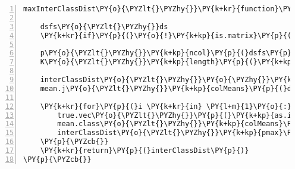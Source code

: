 \begin{Verbatim}[commandchars=\\\{\},codes={\catcode`\$=3\catcode`\^=7\catcode`\_=8},gobble=0,numbers=left,fontfamily=fvm,fontshape=n,fontsize=\footnotesize,tabsize=2]
maxInterClassDist\PY{o}{\PYZlt{}\PYZhy{}}\PY{k+kr}{function}\PY{p}{(}ds\PY{p}{,}class.vec\PY{p}{)}\PY{p}{\PYZob{}}

	dsfs\PY{o}{\PYZlt{}\PYZhy{}}ds
	\PY{k+kr}{if}\PY{p}{(}\PY{o}{!}\PY{k+kp}{is.matrix}\PY{p}{(}dsfs\PY{p}{)}\PY{p}{)} dsfs\PY{o}{\PYZlt{}\PYZhy{}}\PY{k+kp}{data.matrix}\PY{p}{(}dsfs\PY{p}{)}  
	
	p\PY{o}{\PYZlt{}\PYZhy{}}\PY{k+kp}{ncol}\PY{p}{(}dsfs\PY{p}{)}
	K\PY{o}{\PYZlt{}\PYZhy{}}\PY{k+kp}{length}\PY{p}{(}\PY{k+kp}{levels}\PY{p}{(}class.vec\PY{p}{)}\PY{p}{)}
	
	interClassDist\PY{o}{\PYZlt{}\PYZhy{}}\PY{o}{\PYZhy{}}\PY{k+kc}{Inf}
	mean.j\PY{o}{\PYZlt{}\PYZhy{}}\PY{k+kp}{colMeans}\PY{p}{(}dsfs\PY{p}{)}
	
	\PY{k+kr}{for}\PY{p}{(}i \PY{k+kr}{in} \PY{l+m}{1}\PY{o}{:}K\PY{p}{)}\PY{p}{\PYZob{}}
		true.vec\PY{o}{\PYZlt{}\PYZhy{}}\PY{p}{(}\PY{k+kp}{as.integer}\PY{p}{(}class.vec\PY{p}{)}\PY{o}{==}i\PY{p}{)}
		mean.class\PY{o}{\PYZlt{}\PYZhy{}}\PY{k+kp}{colMeans}\PY{p}{(}\PY{k+kp}{as.matrix}\PY{p}{(}dsfs\PY{p}{[}true.vec\PY{p}{,}\PY{p}{]}\PY{p}{,}ncol\PY{o}{=}p\PY{p}{)}\PY{p}{)}
		interClassDist\PY{o}{\PYZlt{}\PYZhy{}}\PY{k+kp}{pmax}\PY{p}{(}interClassDist\PY{p}{,}\PY{k+kp}{abs}\PY{p}{(}mean.j\PY{o}{\PYZhy{}}mean.class\PY{p}{)}\PY{p}{)}
	\PY{p}{\PYZcb{}}
	\PY{k+kr}{return}\PY{p}{(}interClassDist\PY{p}{)}
\PY{p}{\PYZcb{}}
\end{Verbatim}
